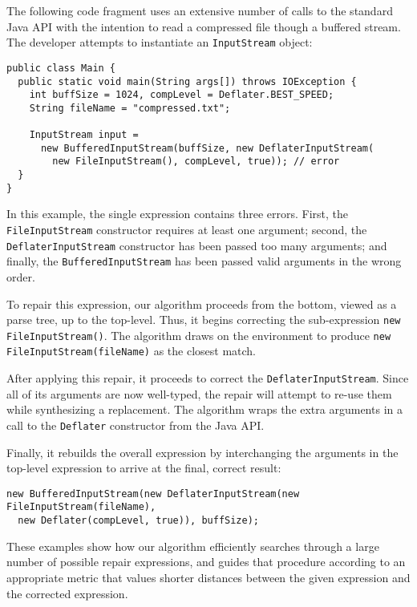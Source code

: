The following code fragment uses an extensive number of calls to the standard Java API with the intention to read a compressed file though a buffered stream. The developer attempts to instantiate an \lstinline{InputStream} object:
\begin{lstlisting}
public class Main {
  public static void main(String args[]) throws IOException {
    int buffSize = 1024, compLevel = Deflater.BEST_SPEED;
    String fileName = "compressed.txt";
    
    InputStream input = 
      new BufferedInputStream(buffSize, new DeflaterInputStream(
        new FileInputStream(), compLevel, true)); // error 
  }
}
\end{lstlisting}
In this example, the single expression contains three errors. First, the \lstinline{FileInputStream} constructor requires at least one argument; second, the \lstinline{DeflaterInputStream} constructor has been passed too many arguments; and finally, the \lstinline{BufferedInputStream} has been passed valid arguments in the wrong order.

To repair this expression, our algorithm proceeds from the bottom, viewed as a parse tree, up to the top-level. Thus, it begins correcting the sub-expression \lstinline{new FileInputStream()}. The algorithm draws on the environment to produce \lstinline{new FileInputStream(fileName)} as the closest match.

After applying this repair, it proceeds to correct the \lstinline{DeflaterInputStream}. Since all of its arguments are now well-typed, the repair will attempt to re-use them while synthesizing a replacement. The algorithm wraps the extra arguments in a call to the \lstinline{Deflater} constructor from the Java API.

Finally, it rebuilds the overall expression by interchanging the arguments in the top-level expression to arrive at the final, correct result:
\begin{lstlisting}   
new BufferedInputStream(new DeflaterInputStream(new FileInputStream(fileName),
  new Deflater(compLevel, true)), buffSize);
\end{lstlisting}

These examples show how our algorithm efficiently searches through a large number of possible repair expressions, and guides that procedure according to an appropriate metric that values shorter distances between the given expression and the corrected expression.
